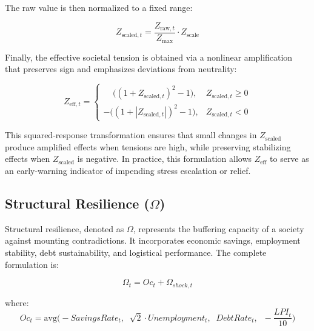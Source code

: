 \documentclass[12pt,a4paper]{article}
\begin{document}
The raw value is then normalized to a fixed range:

\begin{equation}
Z_{\mathrm{scaled},t} = \frac{Z_{\mathrm{raw},t}}{Z_{\max}} \cdot Z_{\mathrm{scale}}
\end{equation}

\noindent Finally, the effective societal tension is obtained via a nonlinear amplification 
that preserves sign and emphasizes deviations from neutrality:

\begin{equation}
Z_{\mathrm{eff},t} = 
\begin{cases}
\;\;\;\;\big( (1 + Z_{\mathrm{scaled},t})^2 - 1 \big), & Z_{\mathrm{scaled},t} \geq 0 \\
- \big( (1 + |Z_{\mathrm{scaled},t}|)^2 - 1 \big), & Z_{\mathrm{scaled},t} < 0
\end{cases}
\end{equation}

\noindent This squared-response transformation ensures that small changes in $Z_{\mathrm{scaled}}$ 
produce amplified effects when tensions are high, while preserving stabilizing effects 
when $Z_{\mathrm{scaled}}$ is negative. In practice, this formulation allows $Z_{\mathrm{eff}}$ 
to serve as an early-warning indicator of impending stress escalation or relief.
\subsection{Structural Resilience (\texorpdfstring{$\Omega$}{Omega})}

Structural resilience, denoted as $\Omega$, represents the buffering capacity of 
a society against mounting contradictions. It incorporates economic savings, 
employment stability, debt sustainability, and logistical performance. 
The complete formulation is:

\begin{equation}
\Omega_t = Oc_t + \Omega_{shock,t}
\end{equation}

\noindent where:
\begin{equation}
Oc_t = \mathrm{avg}\Big( -SavingsRate_t,\;\; \sqrt{2} \cdot Unemployment_t,\;\; DebtRate_t,\;\; -\frac{LPI_t}{10} \Big)
\end{equation}
\end{document}
